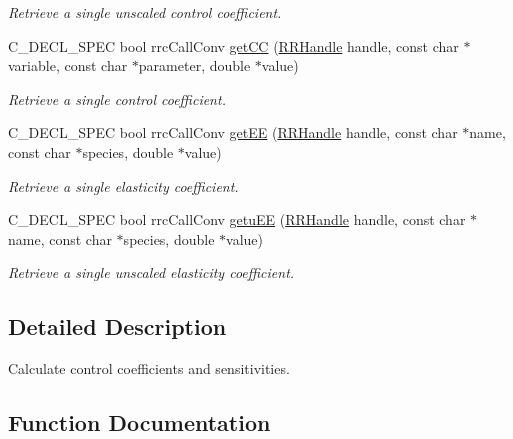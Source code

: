 \begin{DoxyCompactItemize}
\begin{DoxyCompactList}\small\item\em Retrieve a single unscaled control coefficient. \end{DoxyCompactList}\item 
C\+\_\+\+D\+E\+C\+L\+\_\+\+S\+P\+E\+C bool rrc\+Call\+Conv \hyperlink{group__mca_ga186d25721094be37bf8f82dcc2662652}{get\+C\+C} (\hyperlink{rrc__types_8h_a1d68f0592372208fa5a5f2799ea4b3ae}{R\+R\+Handle} handle, const char $\ast$variable, const char $\ast$parameter, double $\ast$value)
\begin{DoxyCompactList}\small\item\em Retrieve a single control coefficient. \end{DoxyCompactList}\item 
C\+\_\+\+D\+E\+C\+L\+\_\+\+S\+P\+E\+C bool rrc\+Call\+Conv \hyperlink{group__mca_ga1965125a33ed28f80fbdce867f8bde93}{get\+E\+E} (\hyperlink{rrc__types_8h_a1d68f0592372208fa5a5f2799ea4b3ae}{R\+R\+Handle} handle, const char $\ast$name, const char $\ast$species, double $\ast$value)
\begin{DoxyCompactList}\small\item\em Retrieve a single elasticity coefficient. \end{DoxyCompactList}\item 
C\+\_\+\+D\+E\+C\+L\+\_\+\+S\+P\+E\+C bool rrc\+Call\+Conv \hyperlink{group__mca_ga0b1b29ecf19805b173e35ca3388d3deb}{getu\+E\+E} (\hyperlink{rrc__types_8h_a1d68f0592372208fa5a5f2799ea4b3ae}{R\+R\+Handle} handle, const char $\ast$name, const char $\ast$species, double $\ast$value)
\begin{DoxyCompactList}\small\item\em Retrieve a single unscaled elasticity coefficient. \end{DoxyCompactList}\end{DoxyCompactItemize}


\subsection{Detailed Description}
Calculate control coefficients and sensitivities. 



\subsection{Function Documentation}
\hypertarget{group__mca_ga186d25721094be37bf8f82dcc2662652}{}
